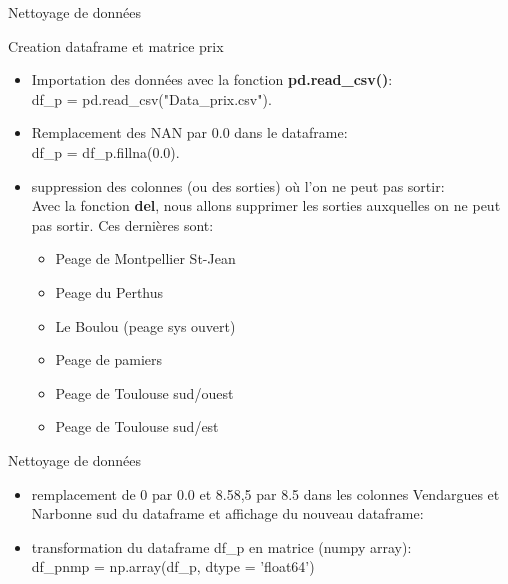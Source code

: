 \documentclass[aspectratio=169]{beamer}
\begin{document}
\begin{frame}{Nettoyage de données}
\begin{block}{Creation dataframe et matrice prix}
 \begin{itemize}
\item Importation des données avec la fonction \textbf{pd.read\_csv()}:\\[2 mm]
df\_p = pd.read\_csv("Data\_prix.csv").\\[2 mm]
\item Remplacement des NAN par 0.0 dans le dataframe:\\
df\_p = df\_p.fillna(0.0).\\[2 mm]
\item suppression des colonnes (ou des sorties) où l'on ne peut pas sortir:\\[2 mm]
Avec la fonction \textbf{del}, nous allons supprimer les sorties auxquelles on ne peut pas sortir. Ces dernières sont:
\begin{itemize}
\item Peage de Montpellier St-Jean
\item Peage du Perthus
\item Le Boulou (peage sys ouvert)
\item Peage de pamiers
\item Peage de Toulouse sud/ouest
\item Peage de Toulouse sud/est

\end{itemize}    
\end{itemize}  
\end{block}
  
\end{frame}    

\begin{frame}{Nettoyage de données}
\begin{block}{}
 \begin{itemize}
\item remplacement de 0 par 0.0 et 8.58,5 par 8.5 dans les colonnes Vendargues et Narbonne sud du dataframe et affichage du nouveau dataframe:\\[2 mm]

\item transformation du dataframe df\_p en matrice (numpy array):\\[2 mm]
df\_pnmp = np.array(df\_p, dtype = 'float64')
\end{itemize}
\end{block}

\end{frame}
\end{document}
